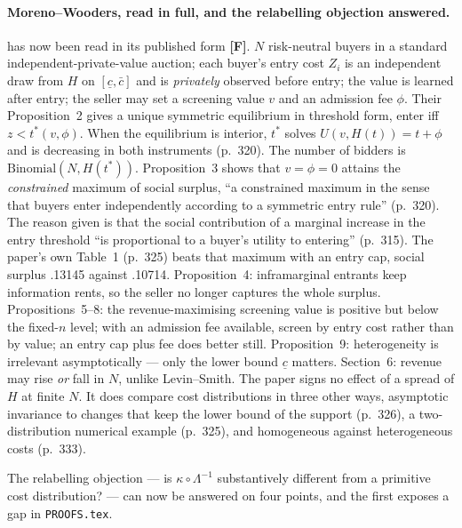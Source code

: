 \documentclass[11pt,a4paper]{article}
\begin{document}
\paragraph{Moreno--Wooders, read in full, and the relabelling objection answered.}
\citet{MorenoWooders2011} has now been read in its published form \textbf{[F]}.
$N$ risk-neutral buyers in a standard independent-private-value auction; each
buyer's entry cost $Z_i$ is an independent draw from $H$ on $[\underline c,
\bar c]$ and is \emph{privately} observed before entry; the value is learned
after entry; the seller may set a screening value $v$ and an admission fee
$\phi$. Their Proposition~2 gives a unique symmetric equilibrium in threshold
form, enter iff $z < t^*(v,\phi)$. When the equilibrium is interior, $t^*$
solves $U(v, H(t)) = t + \phi$ and is decreasing in both instruments (p.~320).
The number of bidders is $\mathrm{Binomial}(N, H(t^*))$. Proposition~3 shows
that $v = \phi = 0$ attains the \emph{constrained} maximum of social surplus,
``a constrained maximum in the sense that buyers enter independently according
to a symmetric entry rule'' (p.~320). The reason given is that the social
contribution of a marginal increase in the entry threshold ``is proportional to
a buyer's utility to entering'' (p.~315). The paper's own Table~1 (p.~325)
beats that maximum with an entry cap, social surplus .13145 against .10714.
Proposition~4: inframarginal entrants keep information rents, so
the seller no longer captures the whole surplus. Propositions~5--8: the
revenue-maximising screening value is positive but below the fixed-$n$ level;
with an admission fee available, screen by entry cost rather than by value; an
entry cap plus fee does better still. Proposition~9: heterogeneity is
irrelevant asymptotically --- only the lower bound $\underline c$ matters.
Section~6: revenue may rise \emph{or} fall in $N$, unlike Levin--Smith. The
paper signs no effect of a spread of $H$ at finite $N$. It does compare cost
distributions in three other ways, asymptotic invariance to changes that keep
the lower bound of the support (p.~326), a two-distribution numerical example
(p.~325), and homogeneous against heterogeneous costs (p.~333).

The relabelling objection --- is $\kappa \circ \Lambda^{-1}$ substantively
different from a primitive cost distribution? --- can now be answered on four
points, and the first exposes a gap in \texttt{PROOFS.tex}.
\end{document}
